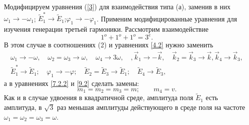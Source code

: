 \documentclass[a4paper]{article}
\begin{document}
	Модифицируем уравнения (\eqref{3}) для взаимодействия типа (а), заменив в них $\omega_{1}\rightarrow-\omega_{1}$; $\tilde{E}_{1}^{*}\rightarrow\tilde{E}_{1}$;$\varphi_{1}\rightarrow-\varphi_{1}$. Применим модифицированные уравнения  для изучения генерации третьей гармоники. Рассмотрим взаимодействие
	\begin{equation}
		1^{o}+1^{o}+1^{o}=3^{e}.
		\label{12.2}
	\end{equation}
	В этом случае в соотношениях (2)  и уравнениях \eqref{4.2} нужно заменить 
	\begin{multline}
		\omega_{1}\rightarrow-\omega,\quad\omega_{2}=\omega_{3}\rightarrow\omega,\quad\omega_{4}\rightarrow3\omega,\quad,\vec{k}_{1}\rightarrow-\vec{k},\quad\vec{k}_{2}=\vec{k}_{3}\rightarrow\vec{k},\vec{k}_{4}\rightarrow\vec{k}_{3},\\
		\tilde{E}_{1}^{*}\rightarrow\tilde{E}_{1};\quad\varphi_{1}\rightarrow-\varphi;\quad\tilde{E}_{2}=\tilde{E}_{3}\rightarrow\tilde{E}_{1};\quad\tilde{E}_{4}\rightarrow\tilde{E}_{3},\label{13.2}
	\end{multline}
	а  в уравнениях \eqref{7.2.2} и \eqref{9.2} сделать замены:
	\begin{equation}
		m_{1}=m_{2}=m_{3}=m;\qquad m_{4}=v.
		\label{14.2}
	\end{equation}
	Как и в случае удвоения в квадратичной среде, амплитуда поля  $\tilde{E}_{1}$  есть амплитуда, в $\sqrt{3}$ раз меньшая амплитуды действующего в среде поля на частоте $\omega_{1}=\omega_{2}=\omega_{3}=\omega$. 
	
\end{document}
